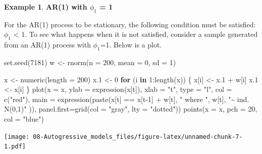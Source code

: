 \documentclass[
]{book}
\newenvironment{Shaded}{\begin{snugshade}}{\end{snugshade}}
\newcommand{\AttributeTok}[1]{\textcolor[rgb]{0.77,0.63,0.00}{#1}}
\newcommand{\ControlFlowTok}[1]{\textcolor[rgb]{0.13,0.29,0.53}{\textbf{#1}}}
\newcommand{\DecValTok}[1]{\textcolor[rgb]{0.00,0.00,0.81}{#1}}
\newcommand{\FloatTok}[1]{\textcolor[rgb]{0.00,0.00,0.81}{#1}}
\newcommand{\FunctionTok}[1]{\textcolor[rgb]{0.00,0.00,0.00}{#1}}
\newcommand{\NormalTok}[1]{#1}
\newcommand{\OtherTok}[1]{\textcolor[rgb]{0.56,0.35,0.01}{#1}}
\newcommand{\SpecialCharTok}[1]{\textcolor[rgb]{0.00,0.00,0.00}{#1}}
\newcommand{\StringTok}[1]{\textcolor[rgb]{0.31,0.60,0.02}{#1}}
\theoremstyle{definition}
\theoremstyle{definition}
\newtheorem{example}{Example}[chapter]
\theoremstyle{definition}
\theoremstyle{definition}
\theoremstyle{remark}
\begin{document}
\begin{example}
\textbf{AR(1) with \(\phi_1\) = 1}

For the AR(1) process to be stationary, the following condition must be satisfied: \textbar{}\(\phi_1\)\textbar{} \textless{} 1. To see what happens when it is not satisfied, consider a sample generated from an AR(1) process with \(\phi_1\)=1. Below is a plot.

\begin{Shaded}
\begin{Highlighting}[]
\FunctionTok{set.seed}\NormalTok{(}\DecValTok{7181}\NormalTok{)  }
\NormalTok{w }\OtherTok{\textless{}{-}} \FunctionTok{rnorm}\NormalTok{(}\AttributeTok{n =} \DecValTok{200}\NormalTok{, }\AttributeTok{mean =} \DecValTok{0}\NormalTok{, }\AttributeTok{sd =} \DecValTok{1}\NormalTok{)}

\NormalTok{x }\OtherTok{\textless{}{-}} \FunctionTok{numeric}\NormalTok{(}\AttributeTok{length =} \DecValTok{200}\NormalTok{)}
\NormalTok{x}\FloatTok{.1} \OtherTok{\textless{}{-}} \DecValTok{0}
\ControlFlowTok{for}\NormalTok{ (i }\ControlFlowTok{in} \DecValTok{1}\SpecialCharTok{:}\FunctionTok{length}\NormalTok{(x)) \{}
\NormalTok{  x[i] }\OtherTok{\textless{}{-}}\NormalTok{ x}\FloatTok{.1}  \SpecialCharTok{+}\NormalTok{ w[i] }
\NormalTok{  x}\FloatTok{.1} \OtherTok{\textless{}{-}}\NormalTok{ x[i] }
\NormalTok{\}}
\FunctionTok{plot}\NormalTok{(}\AttributeTok{x =}\NormalTok{ x, }\AttributeTok{ylab =} \FunctionTok{expression}\NormalTok{(x[t]), }\AttributeTok{xlab =} \StringTok{"t"}\NormalTok{, }\AttributeTok{type =} 
  \StringTok{"l"}\NormalTok{, }\AttributeTok{col =} \FunctionTok{c}\NormalTok{(}\StringTok{"red"}\NormalTok{), }\AttributeTok{main =} 
  \FunctionTok{expression}\NormalTok{(}\FunctionTok{paste}\NormalTok{(x[t] }\SpecialCharTok{==}\NormalTok{ x[t}\DecValTok{{-}1}\NormalTok{] }\SpecialCharTok{+}\NormalTok{ w[t], }\StringTok{" where "}\NormalTok{, }
\NormalTok{  w[t], }\StringTok{"\textasciitilde{} ind. N(0,1)"}\NormalTok{ )), }\AttributeTok{panel.first=}\FunctionTok{grid}\NormalTok{(}\AttributeTok{col =} 
  \StringTok{"gray"}\NormalTok{, }\AttributeTok{lty =} \StringTok{"dotted"}\NormalTok{))}
\FunctionTok{points}\NormalTok{(}\AttributeTok{x =}\NormalTok{ x, }\AttributeTok{pch =} \DecValTok{20}\NormalTok{, }\AttributeTok{col =} \StringTok{"blue"}\NormalTok{)}
\end{Highlighting}
\end{Shaded}

\texttt{[image: 08-Autogressive\_models\_files/figure-latex/unnamed-chunk-7-1.pdf]}


\end{example}
\end{document}
